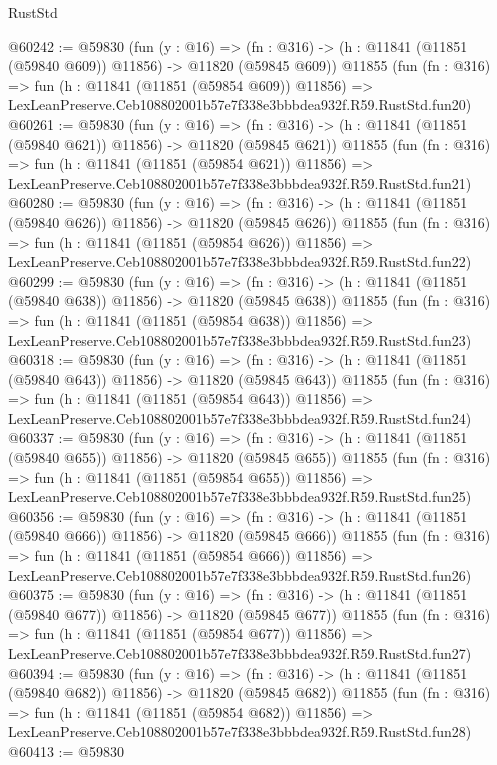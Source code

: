 \begin{lexlean}{RustStd}
\begin{coremodule}
@60242 := @59830
    (fun (y : @16) =>
    (fn : @316) -> (h : @11841 (@11851 (@59840 @609)) @11856) -> @11820 (@59845 @609))
    @11855
    (fun (fn : @316) =>
    fun (h : @11841 (@11851 (@59854 @609)) @11856) =>
    LexLeanPreserve.Ceb108802001b57e7f338e3bbbdea932f.R59.RustStd.fun20)
@60261 := @59830
    (fun (y : @16) =>
    (fn : @316) -> (h : @11841 (@11851 (@59840 @621)) @11856) -> @11820 (@59845 @621))
    @11855
    (fun (fn : @316) =>
    fun (h : @11841 (@11851 (@59854 @621)) @11856) =>
    LexLeanPreserve.Ceb108802001b57e7f338e3bbbdea932f.R59.RustStd.fun21)
@60280 := @59830
    (fun (y : @16) =>
    (fn : @316) -> (h : @11841 (@11851 (@59840 @626)) @11856) -> @11820 (@59845 @626))
    @11855
    (fun (fn : @316) =>
    fun (h : @11841 (@11851 (@59854 @626)) @11856) =>
    LexLeanPreserve.Ceb108802001b57e7f338e3bbbdea932f.R59.RustStd.fun22)
@60299 := @59830
    (fun (y : @16) =>
    (fn : @316) -> (h : @11841 (@11851 (@59840 @638)) @11856) -> @11820 (@59845 @638))
    @11855
    (fun (fn : @316) =>
    fun (h : @11841 (@11851 (@59854 @638)) @11856) =>
    LexLeanPreserve.Ceb108802001b57e7f338e3bbbdea932f.R59.RustStd.fun23)
@60318 := @59830
    (fun (y : @16) =>
    (fn : @316) -> (h : @11841 (@11851 (@59840 @643)) @11856) -> @11820 (@59845 @643))
    @11855
    (fun (fn : @316) =>
    fun (h : @11841 (@11851 (@59854 @643)) @11856) =>
    LexLeanPreserve.Ceb108802001b57e7f338e3bbbdea932f.R59.RustStd.fun24)
@60337 := @59830
    (fun (y : @16) =>
    (fn : @316) -> (h : @11841 (@11851 (@59840 @655)) @11856) -> @11820 (@59845 @655))
    @11855
    (fun (fn : @316) =>
    fun (h : @11841 (@11851 (@59854 @655)) @11856) =>
    LexLeanPreserve.Ceb108802001b57e7f338e3bbbdea932f.R59.RustStd.fun25)
@60356 := @59830
    (fun (y : @16) =>
    (fn : @316) -> (h : @11841 (@11851 (@59840 @666)) @11856) -> @11820 (@59845 @666))
    @11855
    (fun (fn : @316) =>
    fun (h : @11841 (@11851 (@59854 @666)) @11856) =>
    LexLeanPreserve.Ceb108802001b57e7f338e3bbbdea932f.R59.RustStd.fun26)
@60375 := @59830
    (fun (y : @16) =>
    (fn : @316) -> (h : @11841 (@11851 (@59840 @677)) @11856) -> @11820 (@59845 @677))
    @11855
    (fun (fn : @316) =>
    fun (h : @11841 (@11851 (@59854 @677)) @11856) =>
    LexLeanPreserve.Ceb108802001b57e7f338e3bbbdea932f.R59.RustStd.fun27)
@60394 := @59830
    (fun (y : @16) =>
    (fn : @316) -> (h : @11841 (@11851 (@59840 @682)) @11856) -> @11820 (@59845 @682))
    @11855
    (fun (fn : @316) =>
    fun (h : @11841 (@11851 (@59854 @682)) @11856) =>
    LexLeanPreserve.Ceb108802001b57e7f338e3bbbdea932f.R59.RustStd.fun28)
@60413 := @59830

\end{coremodule}
\end{lexlean}
